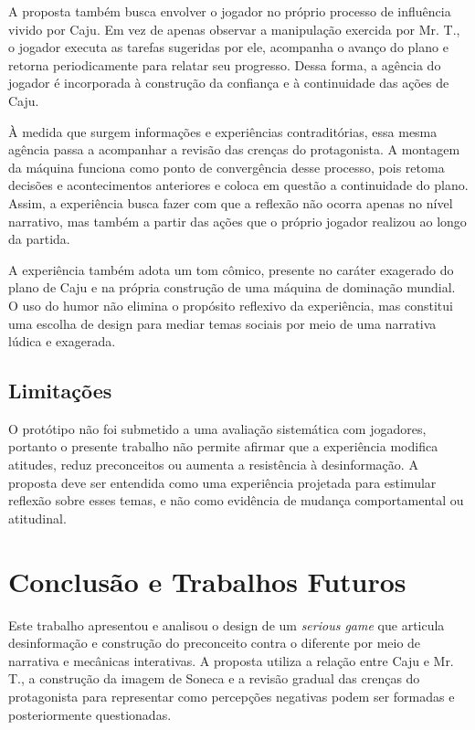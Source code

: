 \documentclass[12pt]{article}
\begin{document}
A proposta também busca envolver o jogador no próprio processo de influência vivido por Caju. Em vez de apenas observar a manipulação exercida por Mr. T., o jogador executa as tarefas sugeridas por ele, acompanha o avanço do plano e retorna periodicamente para relatar seu progresso. Dessa forma, a agência do jogador é incorporada à construção da confiança e à continuidade das ações de Caju.

À medida que surgem informações e experiências contraditórias, essa mesma agência passa a acompanhar a revisão das crenças do protagonista. A montagem da máquina funciona como ponto de convergência desse processo, pois retoma decisões e acontecimentos anteriores e coloca em questão a continuidade do plano. Assim, a experiência busca fazer com que a reflexão não ocorra apenas no nível narrativo, mas também a partir das ações que o próprio jogador realizou ao longo da partida.

A experiência também adota um tom cômico, presente no caráter exagerado do plano de Caju e na própria construção de uma máquina de dominação mundial. O uso do humor não elimina o propósito reflexivo da experiência, mas constitui uma escolha de design para mediar temas sociais por meio de uma narrativa lúdica e exagerada.

\subsection{Limitações}

O protótipo não foi submetido a uma avaliação sistemática com jogadores, portanto o presente trabalho não permite afirmar que a experiência modifica atitudes, reduz preconceitos ou aumenta a resistência à desinformação. A proposta deve ser entendida como uma experiência projetada para estimular reflexão sobre esses temas, e não como evidência de mudança comportamental ou atitudinal.

\section{Conclusão e Trabalhos Futuros}
Este trabalho apresentou e analisou o design de um \textit{serious game} que articula desinformação e construção do preconceito contra o diferente por meio de narrativa e mecânicas interativas. A proposta utiliza a relação entre Caju e Mr. T., a construção da imagem de Soneca e a revisão gradual das crenças do protagonista para representar como percepções negativas podem ser formadas e posteriormente questionadas.
\end{document}
